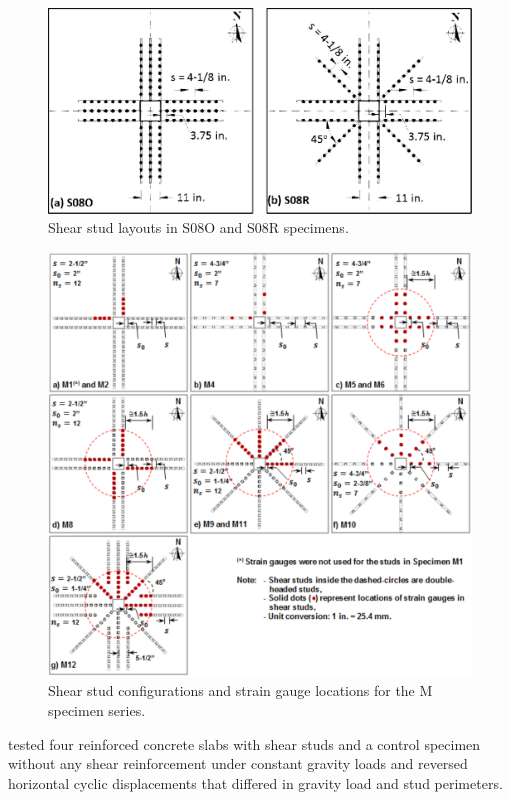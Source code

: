 \documentclass[twocolumn]{article} %
\begin{document}
\begin{figure}\centering
    \includegraphics[width=\columnwidth]{Figures/d2016f2.pdf}
    \caption{Shear stud layouts in S08O and S08R specimens\citep{dam2016}.}
    \label{d2016f2}
    \end{figure}
    \begin{figure}\centering
        \includegraphics[width=\columnwidth]{Figures/d2017f3.pdf}
        \caption{Shear stud configurations and strain gauge locations for the M specimen series\citep{dam2017punching}.}
        \label{d2017f3}
        \end{figure}
\cite{isufi2018} tested four reinforced concrete slabs with shear studs and a control specimen without any shear reinforcement under constant gravity loads and reversed horizontal cyclic displacements that differed in gravity load and stud perimeters. 
\end{document}
